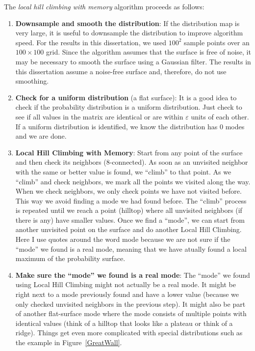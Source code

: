 The \textit{local hill climbing with memory} algorithm proceeds as follows:
\begin{enumerate}
\item \textbf{Downsample and smooth the distribution}: If the distribution map is very large, it is useful to downsample the distribution to improve algorithm speed. For the results in this dissertation, we used $100^2$ sample points over an $100 \times 100$ grid. Since the algorithm assumes that the surface is free of noise, it may be necessary to smooth the surface using a Gaussian filter. The results in this dissertation assume a noise-free surface and, therefore, do not use smoothing.
\item \textbf{Check for a uniform distribution} (a flat surface): It is a good idea to check if the probability distribution is a uniform distribution. Just check to see if all values in the matrix are identical or are within $\varepsilon$ units of each other. If a uniform distribution is identified, we know the distribution has 0 modes and we are done.
\item \textbf{Local Hill Climbing with Memory}: Start from any point of the surface and then check its neighbors (8-connected). As soon as an unvisited neighbor with the same or better value is found, we ``climb'' to that point. As we ``climb'' and check neighbors, we mark all the points we visited along the way. When we check neighbors, we only check points we have not visited before. This way we avoid finding a mode we had found before. The ``climb'' process is repeated until we reach a point (hilltop) where all unvisited neighbors (if there is any) have smaller values. Once we find a ``mode'', we can start from another unvisited point on the surface and do another Local Hill Climbing. Here I use quotes around the word mode because we are not sure if the ``mode'' we found is a real mode, meaning that we have atually found a local maximum of the probability surface.
\item \textbf{Make sure the ``mode'' we found is a real mode}: The ``mode'' we found using Local Hill Climbing might not actually be a real mode. It might be right next to a mode previously found and have a lower value (because we only checked unvisited neighbors in the previous step). It might also be part of another flat-surface mode where the mode consists of multiple points with identical values (think of a hilltop that looks like a plateau or think of a ridge). Things get even more complicated with special distributions such as the example in Figure~\ref{GreatWall}. 


\end{enumerate}
